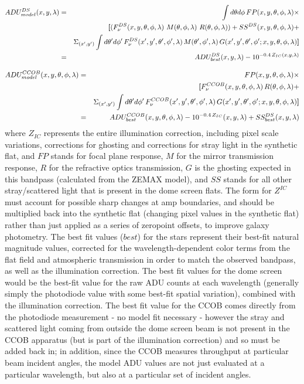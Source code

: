 \documentclass[12pt,preprint]{aastex}
\begin{document}
\begin{eqnarray}
ADU^{DS}_{model}(x,y,\lambda) & = & \int d\theta d\phi \, FP(x,y,\theta,\phi,\lambda) \times  \nonumber \\
& & {\textbf[}  (F_\nu^{DS}(x,y,\theta,\phi,\lambda)\,\, M(\theta,\phi,\lambda)\,\, R(\theta,\phi,\lambda)) 
+ SS^{DS}(x,y,\theta,\phi,\lambda) +  \nonumber \\ 
& & \Sigma_{(x',y')} \int d\theta' d\phi' \,F_\nu^{DS}(x',y',\theta', \phi',\lambda)\,M(\theta',\phi',\lambda)\,G(x',y',\theta',\phi'; x,y,\theta,\phi,\lambda) {\textbf]} \nonumber  \\
 & = & ADU^{DS}_{best}(x,y,\lambda) - 10^{-0.4 \, Z_{IC}(x,y,\lambda)} 
\end{eqnarray}


\begin{eqnarray}
ADU^{CCOB}_{model}(x,y,\theta,\phi,\lambda) & = &  FP(x,y,\theta,\phi,\lambda) \times \nonumber \\
& & {\textbf[}  F_\nu^{CCOB}(x,y,\theta,\phi,\lambda)\,R(\theta,\phi,\lambda) + \nonumber \\
&& \Sigma_{(x',y')} \int d\theta' d\phi' \,F_\nu^{CCOB}(x',y',\theta',\phi',\lambda)\,G(x',y',\theta',\phi';x,y,\theta,\phi,\lambda) {\textbf]} \nonumber \\
& = & ADU^{CCOB}_{best}(x,y,\theta,\phi,\lambda) - 10^{-0.4\,Z_{IC}}(x,y,\lambda) + SS^{DS}_{best}(x,y,\lambda) 
\end{eqnarray} 
where $Z_{IC}$ represents the entire illumination correction,
including pixel scale variations, corrections for ghosting and
corrections for stray light in the synthetic flat, and $FP$ stands for
focal plane response, $M$ for the mirror transmission response, $R$ for the
refractive optics transmission, $G$ is the ghosting expected in this bandpass (calculated from
the ZEMAX model), and $SS$ stands for all other stray/scattered light
that is present in the dome screen flats. The form for
$Z^{IC}$ must account for possible sharp changes at amp boundaries,
and should be multiplied back into the synthetic flat (changing pixel
values in the synthetic flat) rather than just applied as a series of
zeropoint offsets, to improve galaxy photometry. The best fit values ($best$)
for the stars represent their best-fit natural magnitude values, corrected for the wavelength-dependent color
terms from the flat field and atmospheric transmission in order 
to match the observed bandpass, as well as the illumination
correction. The best fit values for the dome screen would be the
best-fit value for the raw ADU counts at each wavelength (generally simply the
photodiode value with some best-fit spatial
variation), combined with the illumination
correction. The best fit value for the CCOB comes directly from the
photodiode measurement - no model fit necessary - however the
stray and scattered light coming from outside the dome screen beam is
not present in the CCOB apparatus (but is part of the illumination
correction) and so must be added back in; in addition,
since the CCOB measures throughput at particular beam incident
angles, the model ADU values are not just evaluated at a particular
wavelength, but also at a particular set of incident angles. 
\end{document}
